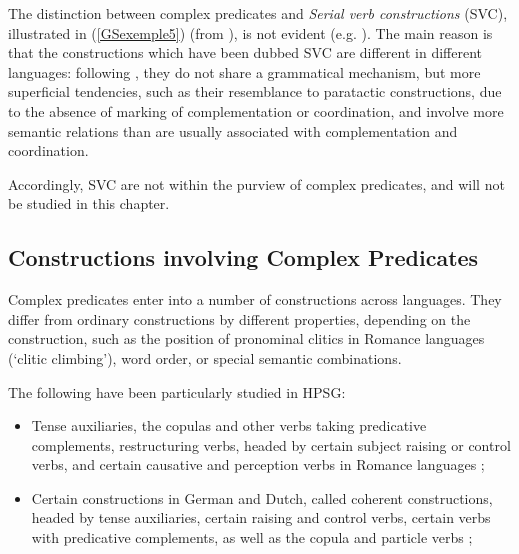 \documentclass[output=paper
	        ,collection
	        ,collectionchapter
 	        ,biblatex
                ,babelshorthands
                ,newtxmath
                ,draftmode
                ,colorlinks, citecolor=brown
]{langscibook}
\begin{document}
{The distinction between complex predicates and \emph{Serial verb constructions} (SVC), illustrated in (\ref{GSexemple5}) (from \citealt[294]{MH2016}), is not evident (e.g. \citealt{andrews1999complex, MH2016}). The main reason is that the constructions which have been dubbed SVC are different in different languages: following \cite{andrews1999complex}, they do not share a grammatical mechanism, but more superficial tendencies, such as their resemblance to paratactic constructions, due to the absence of marking of complementation or coordination, and involve more semantic relations than are usually associated with complementation and coordination.

\z

Accordingly, SVC are not within the purview of complex predicates, and will not be studied in this chapter.

\subsection{Constructions involving Complex Predicates}\label{GSsection1.2}

Complex predicates enter into a number of constructions across languages. They differ from ordinary constructions by different properties, depending on the construction, such as the position of pronominal clitics in Romance languages (`clitic climbing'), word order, or special semantic combinations. 

The following have been particularly studied in HPSG:

\begin{itemize}
	
	\item Tense auxiliaries, the copulas and other verbs taking predicative complements, restructuring verbs, headed by certain subject raising or control verbs, and certain causative and perception verbs in Romance languages \citep{abeille1994complementation, abeille2000french, abeille2001deux, abeille2001varieties, AG2002b-u, AG2010, abeille1995doublestructure, AGMS98a, AGS1998, Monachesi98a};
	
	\item Certain constructions in German and Dutch, called coherent constructions, headed by tense auxiliaries, certain raising and control verbs, certain verbs with predicative complements, as well as the copula and particle verbs \citep{HN89b, HN94a, Rentier94, Kiss94, Kiss95a, BvN98a, HN98a, Kathol98b, Kathol2000a, Meurers2000b-Short, DM2002, dKM2001a,  Mueller2002b, Mueller2003a, muller2018clause};
	

\end{itemize}}
\end{document}
